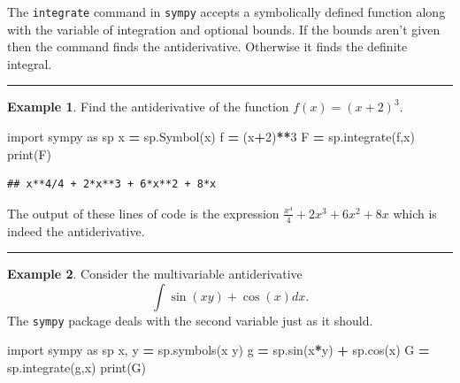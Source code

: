 \documentclass[
]{book}
\newenvironment{Shaded}{\begin{snugshade}}{\end{snugshade}}
\newcommand{\BuiltInTok}[1]{#1}
\newcommand{\DecValTok}[1]{\textcolor[rgb]{0.00,0.00,0.81}{#1}}
\newcommand{\ImportTok}[1]{#1}
\newcommand{\NormalTok}[1]{#1}
\newcommand{\OperatorTok}[1]{\textcolor[rgb]{0.81,0.36,0.00}{\textbf{#1}}}
\newcommand{\StringTok}[1]{\textcolor[rgb]{0.31,0.60,0.02}{#1}}
\theoremstyle{definition}
\theoremstyle{definition}
\newtheorem{example}{Example}[chapter]
\theoremstyle{definition}
\theoremstyle{remark}
\begin{document}
The \texttt{integrate} command in \texttt{sympy} accepts a symbolically defined function along with the variable of integration and optional bounds. If the bounds aren't given then the command finds the antiderivative. Otherwise it finds the definite integral.

\begin{center}\rule{0.5\linewidth}{0.5pt}\end{center}

\begin{example}
\protect\hypertarget{exm:unnamed-chunk-802}{}{\label{exm:unnamed-chunk-802} }Find the antiderivative of the function \(f(x) = (x+2)^3\).
\end{example}

\begin{Shaded}
\begin{Highlighting}[]
\ImportTok{import}\NormalTok{ sympy }\ImportTok{as}\NormalTok{ sp }
\NormalTok{x }\OperatorTok{=}\NormalTok{ sp.Symbol(}\StringTok{\textquotesingle{}x\textquotesingle{}}\NormalTok{)}
\NormalTok{f }\OperatorTok{=}\NormalTok{ (x}\OperatorTok{+}\DecValTok{2}\NormalTok{)}\OperatorTok{**}\DecValTok{3}
\NormalTok{F }\OperatorTok{=}\NormalTok{ sp.integrate(f,x)}
\BuiltInTok{print}\NormalTok{(F)}
\end{Highlighting}
\end{Shaded}

\begin{verbatim}
## x**4/4 + 2*x**3 + 6*x**2 + 8*x
\end{verbatim}

The output of these lines of code is the expression \(\frac{x^{4}}{4} + 2 x^{3} + 6 x^{2} + 8 x\) which is indeed the antiderivative.

\begin{center}\rule{0.5\linewidth}{0.5pt}\end{center}

\begin{example}
\protect\hypertarget{exm:unnamed-chunk-804}{}{\label{exm:unnamed-chunk-804} }Consider the multivariable antiderivative
\[\int \sin(xy) + \cos(x) dx.\]
The \texttt{sympy} package deals with the second variable just as it should.
\end{example}

\begin{Shaded}
\begin{Highlighting}[]
\ImportTok{import}\NormalTok{ sympy }\ImportTok{as}\NormalTok{ sp }
\NormalTok{x, y }\OperatorTok{=}\NormalTok{ sp.symbols(}\StringTok{\textquotesingle{}x y\textquotesingle{}}\NormalTok{)}
\NormalTok{g }\OperatorTok{=}\NormalTok{ sp.sin(x}\OperatorTok{*}\NormalTok{y) }\OperatorTok{+}\NormalTok{ sp.cos(x)}
\NormalTok{G }\OperatorTok{=}\NormalTok{ sp.integrate(g,x) }
\BuiltInTok{print}\NormalTok{(G)}
\end{Highlighting}
\end{Shaded}
\end{document}
